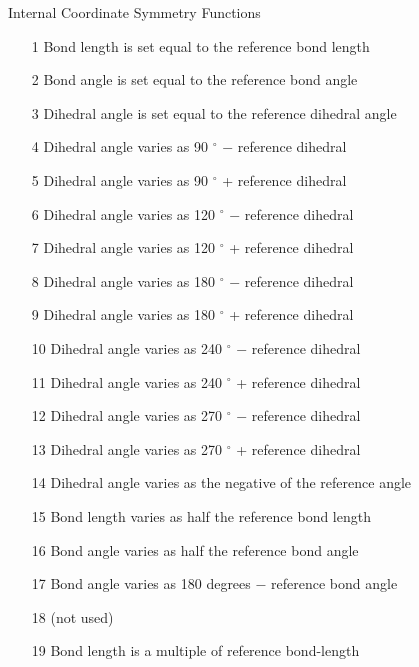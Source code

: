\begin{table}
\caption{\label{isym} Internal Coordinate Symmetry Functions}
\begin{makeimage}
\end{makeimage}
\begin{enumerate}
\item[1] Bond length    is set equal to the reference bond length
\item[2] Bond angle     is set equal to the reference bond angle
\item[3] Dihedral angle is set equal to the reference dihedral angle
\item[4] Dihedral angle varies as  90 $^{\circ}$ $-$ reference dihedral
\item[5] Dihedral angle varies as  90 $^{\circ}$ + reference dihedral
\item[6] Dihedral angle varies as 120 $^{\circ}$ $-$ reference dihedral
\item[7] Dihedral angle varies as 120 $^{\circ}$ + reference dihedral
\item[8] Dihedral angle varies as 180 $^{\circ}$ $-$ reference dihedral
\item[9] Dihedral angle varies as 180 $^{\circ}$ + reference dihedral
\item[10] Dihedral angle varies as 240 $^{\circ}$ $-$ reference dihedral
\item[11] Dihedral angle varies as 240 $^{\circ}$ + reference dihedral
\item[12] Dihedral angle varies as 270 $^{\circ}$ $-$ reference dihedral
\item[13] Dihedral angle varies as 270 $^{\circ}$ + reference dihedral
\item[14] Dihedral angle varies as the negative of the reference angle
\item[15] Bond length varies as half the reference bond length
\item[16] Bond angle varies as half the reference bond angle
\item[17] Bond angle varies as 180 degrees $-$ reference bond angle
\item[18] (not used)
\item[19] Bond length is a multiple of reference  bond-length
\end{enumerate}
\end{table}

